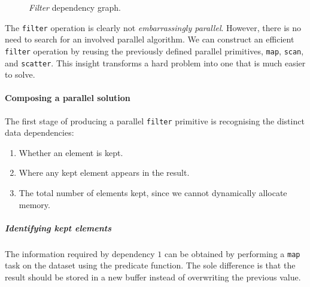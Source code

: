 \begin{figure}[h]
  \caption{\emph{Filter} dependency graph.}
  \label{fig:filtergraph}
  \begin{center}
  \end{center}
\end{figure}

The \verb|filter| operation is clearly not \emph{embarrassingly parallel}. However, there is no need to search for an involved parallel algorithm. We can construct an efficient \verb|filter| operation by reusing the previously defined parallel primitives, \verb|map|, \verb|scan|, and \verb|scatter|. This insight transforms a hard problem into one that is much easier to solve.

\paragraph*{Composing a parallel solution}
The first stage of producing a parallel \verb|filter| primitive is recognising the distinct data dependencies:
\begin{enumerate}
  \item Whether an element is kept.
  \item Where any kept element appears in the result.
  \item The total number of elements kept, since we cannot dynamically allocate memory.
\end{enumerate}

\subparagraph*{Identifying kept elements}
The information required by dependency $1$ can be obtained by performing a \verb|map| task on the dataset using the predicate function. The sole difference is that the result should be stored in a new buffer instead of overwriting the previous value.

